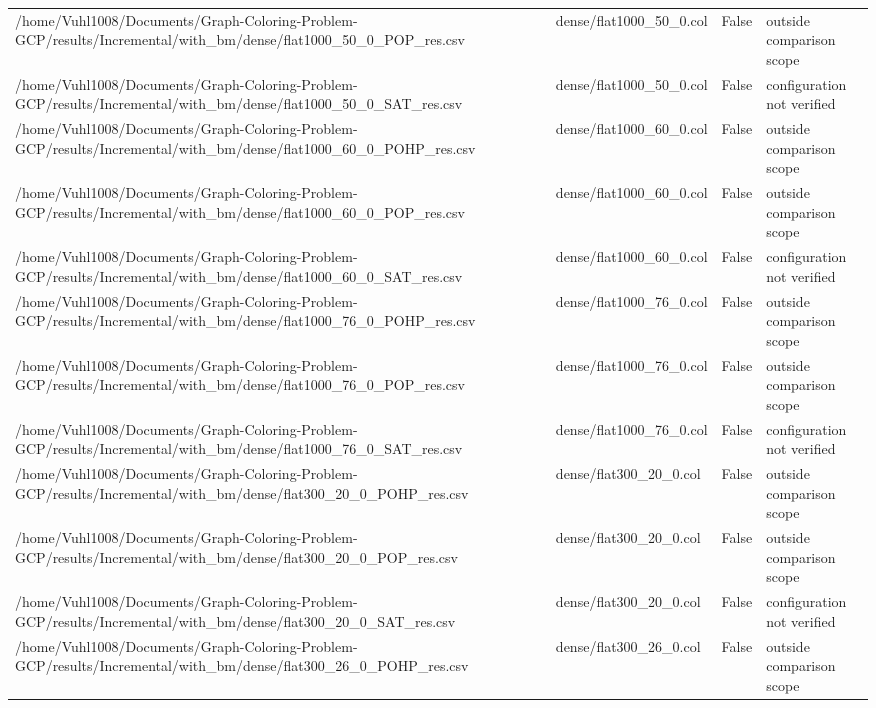 \begin{table}[htbp]
\begin{tabular}{llll}
/home/Vuhl1008/Documents/Graph-Coloring-Problem-GCP/results/Incremental/with\_bm/dense/flat1000\_50\_0\_POP\_res.csv & dense/flat1000\_50\_0.col & False & outside comparison scope \\
/home/Vuhl1008/Documents/Graph-Coloring-Problem-GCP/results/Incremental/with\_bm/dense/flat1000\_50\_0\_SAT\_res.csv & dense/flat1000\_50\_0.col & False & configuration not verified \\
/home/Vuhl1008/Documents/Graph-Coloring-Problem-GCP/results/Incremental/with\_bm/dense/flat1000\_60\_0\_POHP\_res.csv & dense/flat1000\_60\_0.col & False & outside comparison scope \\
/home/Vuhl1008/Documents/Graph-Coloring-Problem-GCP/results/Incremental/with\_bm/dense/flat1000\_60\_0\_POP\_res.csv & dense/flat1000\_60\_0.col & False & outside comparison scope \\
/home/Vuhl1008/Documents/Graph-Coloring-Problem-GCP/results/Incremental/with\_bm/dense/flat1000\_60\_0\_SAT\_res.csv & dense/flat1000\_60\_0.col & False & configuration not verified \\
/home/Vuhl1008/Documents/Graph-Coloring-Problem-GCP/results/Incremental/with\_bm/dense/flat1000\_76\_0\_POHP\_res.csv & dense/flat1000\_76\_0.col & False & outside comparison scope \\
/home/Vuhl1008/Documents/Graph-Coloring-Problem-GCP/results/Incremental/with\_bm/dense/flat1000\_76\_0\_POP\_res.csv & dense/flat1000\_76\_0.col & False & outside comparison scope \\
/home/Vuhl1008/Documents/Graph-Coloring-Problem-GCP/results/Incremental/with\_bm/dense/flat1000\_76\_0\_SAT\_res.csv & dense/flat1000\_76\_0.col & False & configuration not verified \\
/home/Vuhl1008/Documents/Graph-Coloring-Problem-GCP/results/Incremental/with\_bm/dense/flat300\_20\_0\_POHP\_res.csv & dense/flat300\_20\_0.col & False & outside comparison scope \\
/home/Vuhl1008/Documents/Graph-Coloring-Problem-GCP/results/Incremental/with\_bm/dense/flat300\_20\_0\_POP\_res.csv & dense/flat300\_20\_0.col & False & outside comparison scope \\
/home/Vuhl1008/Documents/Graph-Coloring-Problem-GCP/results/Incremental/with\_bm/dense/flat300\_20\_0\_SAT\_res.csv & dense/flat300\_20\_0.col & False & configuration not verified \\
/home/Vuhl1008/Documents/Graph-Coloring-Problem-GCP/results/Incremental/with\_bm/dense/flat300\_26\_0\_POHP\_res.csv & dense/flat300\_26\_0.col & False & outside comparison scope \\

\end{tabular}
\end{table}
